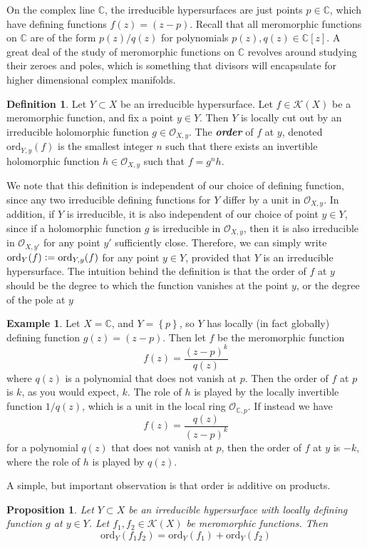 \documentclass[psamsfonts, 12pt]{amsart}
\newtheorem{prop}[thm]{Proposition}
\theoremstyle{definition}
\newtheorem{defn}[thm]{Definition}
\newtheorem{exmp}[thm]{Example}
\theoremstyle{remark}
\renewcommand{\O}{\mathcal{O}}
\newcommand{\ib}[1]{\textbf{\textit{#1}}}
\newcommand{\C}{\mathbb{C}}
\newcommand{\set}[1]{\left\lbrace #1 \right\rbrace}
\newcommand{\defeq}{\vcentcolon=}
\begin{document}
On the complex line $\C$, the irreducible hypersurfaces are just points $p \in \C$,
which have defining functions $f(z) = (z-p)$. Recall that all meromorphic functions
on $\C$ are of the form $p(z)/q(z)$ for polynomials $p(z),q(z) \in \C[z]$. A great
deal of the study of meromorphic functions on $\C$ revolves around studying their zeroes
and poles, which is something that divisors will encapsulate for higher dimensional
complex manifolds.
%
\begin{defn}
Let $Y \subset X$ be an irreducible hypersurface. Let $f \in \mathcal{K}(X)$ be a
meromorphic function, and fix a point $y \in Y$. Then $Y$ is locally cut out by an
irreducible holomorphic function $g \in \O_{X,y}$. The \ib{order} of $f$ at
$y$, denoted $\mathrm{ord}_{Y,y}(f)$ is the smallest integer $n$ such that there exists
an invertible holomorphic function $h \in \O_{X,y}$ such that $f= g^nh$.
\end{defn}
%
We note that this definition is independent of our choice of defining function, since
any two irreducible defining functions for $Y$ differ by a unit in $\O_{X,y}$. In
addition, if $Y$ is irreducible, it is also independent of our choice of point $y \in Y$,
since if a holomorphic function $g$ is irreducible in $\O_{X,y}$, then it is also
irreducible in $\O_{X,y'}$ for any point $y'$ sufficiently close. Therefore, we can
simply write $\mathrm{ord}_Y(f) \defeq \mathrm{ord}_{Y,y}(f)$ for any point $y \in Y$,
provided that $Y$ is an irreducible hypersurface. The intuition behind the definition
is that the order of $f$ at $y$ should be the degree to which the function vanishes
at the point $y$, or the degree of the pole at $y$
%
\begin{exmp}
Let $X = \C$, and $Y = \set{p}$, so $Y$ has locally (in fact globally) defining
function $g(z) = (z-p)$. Then let $f$ be the meromorphic function
\[
f(z) = \frac{(z-p)^k}{q(z)}
\]
where $q(z)$ is a polynomial that does not vanish at $p$.
Then the order of $f$ at $p$ is $k$, as you would expect, $k$. The role of $h$
is played by the locally invertible function $1/q(z)$, which is a unit in the local
ring $\O_{\C,p}$. If instead we have
\[
f(z) = \frac{q(z)}{(z-p)^k}
\]
for a polynomial $q(z)$ that does not vanish at $p$, then the order of $f$
at $y$ is $-k$, where the role of $h$ is played by $q(z)$.
\end{exmp}
%
A simple, but important observation is that order is additive on products.
%
\begin{prop}
Let $Y \subset X$ be an irreducible hypersurface with locally defining function
$g$ at $y \in Y$. Let $f_1,f_2 \in \mathcal{K}(X)$ be meromorphic functions. Then
\[
\mathrm{ord}_Y(f_1f_2) = \mathrm{ord}_Y(f_1) + \mathrm{ord}_Y(f_2)
\]
\end{prop}
\end{document}
